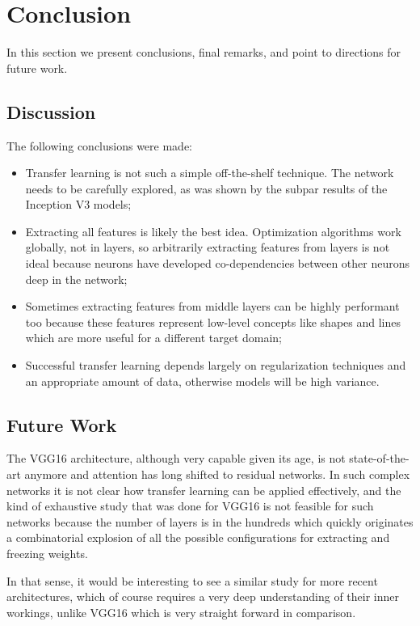 \chapter{Conclusion}
\label{chapter:conclusion}

In this section we present conclusions, final remarks, and point to directions for future work.

\section{Discussion}

The following conclusions were made:

\begin{itemize}
    \item Transfer learning is not such a simple off-the-shelf technique. The network needs to be carefully explored, as was shown by the subpar results of the Inception V3 models;
    \item Extracting all features is likely the best idea. Optimization algorithms work globally, not in layers, so arbitrarily extracting features from layers is not ideal because neurons have developed co-dependencies between other neurons deep in the network;
    \item Sometimes extracting features from middle layers can be highly performant too because these features represent low-level concepts like shapes and lines which are more useful for a different target domain;
    \item Successful transfer learning depends largely on regularization techniques and an appropriate amount of data, otherwise models will be high variance.
\end{itemize}

\section{Future Work}

The VGG16 architecture, although very capable given its age, is not state-of-the-art anymore and attention has long shifted to residual networks. In such complex networks it is not clear how transfer learning can be applied effectively, and the kind of exhaustive study that was done for VGG16 is not feasible for such networks because the number of layers is in the hundreds which quickly originates a combinatorial explosion of all the possible configurations for extracting and freezing weights.

In that sense, it would be interesting to see a similar study for more recent architectures, which of course requires a very deep understanding of their inner workings, unlike VGG16 which is very straight forward in comparison.
